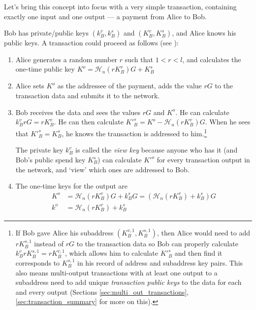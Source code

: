 Let’s bring this concept into focus with a very simple transaction, containing exactly one input and one output --- a payment from Alice to Bob.

Bob has private/public keys $(k_B^v, k_B^s)$ and $(K_B^v, K_B^s)$, and Alice knows his public keys. A transaction could proceed as follows (see  \cite{cryptoNoteWhitePaper}):


\begin{enumerate}
	\item Alice generates a random number $r$ such that $1 < r < l$, and calculates the one-time public key $K^o  = \mathcal{H}_n(r K_B^v)G + K_B^s$ 

	\item Alice sets $K^o$ as the addressee of the payment, adds the value $r G$ to the transaction data and submits it to the network.
	
	\item 	Bob receives the data and sees the values $r G$ and $K^o$. He can calculate $k_B^v r G = r K_B^v$. He can then calculate $K'^s_B = K^o - \mathcal{H}_n(r K_B^v)G$. When he sees that $K'^s_B = K_B^s$, he knows the transaction is addressed to him.\footnote{\label{subaddress_note}If Bob gave Alice his subaddress $(K_B^{v,1}, K_B^{s,1})$, then Alice would need to add $r K_B^{s,1}$ instead of $r G$ to the transaction data so Bob can properly calculate $k_B^v r K_B^{s,1} = r K_B^{v,1}$, which allows him to calculate $K'^s_B$ and then find it corresponds to $K^{s,1}_B$ in his record of address and subaddress key pairs. This also means multi-output transactions with at least one output to a subaddress need to add unique {\em transaction public keys} to the data for each and every output (Sections \ref{sec:multi_out_transactions}, \ref{sec:transaction_summary} for more on this).}
	
	The private key $k_B^v$ is called the {\em view key} because anyone who has it (and Bob’s public spend key $K_B^s$) can calculate $K'^o$ for every transaction output in the network, and ‘view’ which ones are addressed to Bob.
	
	\item The one-time keys for the output are
	\begin{align*}
		K^o &= \mathcal{H}_n(r K_B^v)G + k_B^s G = (\mathcal{H}_n(r K_B^v) + k_B^s)G  \\ 
		k^o &= \mathcal{H}_n(r K_B^v) + k_B^s
	\end{align*}
\end{enumerate}

